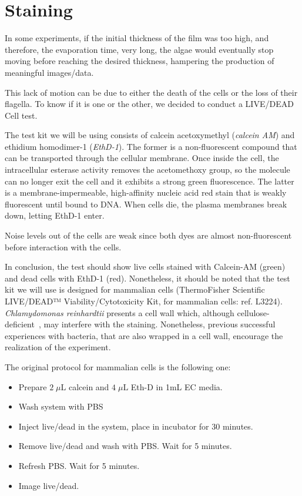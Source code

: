\section{Staining}
\label{mm_staining}

In some experiments, if the initial thickness of the film was too high, and therefore, the evaporation time, very long, the algae would eventually stop moving before reaching the desired thickness, hampering the production of meaningful images/data.

This lack of motion can be due to either the death of the cells or the loss of their flagella. To know if it is one or the other, we decided to conduct a LIVE/DEAD Cell test. 

The test kit we will be using consists of calcein acetoxymethyl (\textit{calcein AM}) and ethidium homodimer-1 (\textit{EthD-1}). The former is a non-fluorescent compound that can be transported through the cellular membrane. Once inside the cell, the intracellular esterase activity removes the acetomethoxy group, so the molecule can no longer exit the cell and it exhibits a strong green fluorescence. The latter is a membrane-impermeable, high-affinity nucleic acid red stain that is weakly fluorescent until bound to DNA. When cells die, the plasma membranes break down, letting EthD-1 enter.

Noise levels out of the cells are weak since both dyes are almost non-fluorescent before interaction with the cells.

In conclusion, the test should show live cells stained with Calcein-AM (green) and dead cells with EthD-1 (red). Nonetheless, it should be noted that the test kit we will use is designed for mammalian cells (ThermoFisher Scientific LIVE/DEAD™ Viability/Cytotoxicity Kit, for mammalian cells: ref. L3224). \textit{Chlamydomonas reinhardtii} presents a cell wall which, although cellulose-deficient~\cite{Imam}, may interfere with the staining. Nonetheless, previous successful experiences with bacteria, that are also wrapped in a cell wall, encourage the realization of the experiment. 

The original protocol for mammalian cells is the following one:

\begin{itemize}
	\item Prepare $2 \; \mu \textrm{L}$ calcein and $4 \; \mu \textrm{L}$ Eth-D in 1mL EC media.
	\item Wash system with PBS
	\item Inject live/dead in the system, place in incubator for 30 minutes.
	\item Remove live/dead and wash with PBS. Wait for 5 minutes.
	\item Refresh PBS. Wait for 5 minutes.
	\item Image live/dead.
\end{itemize}

